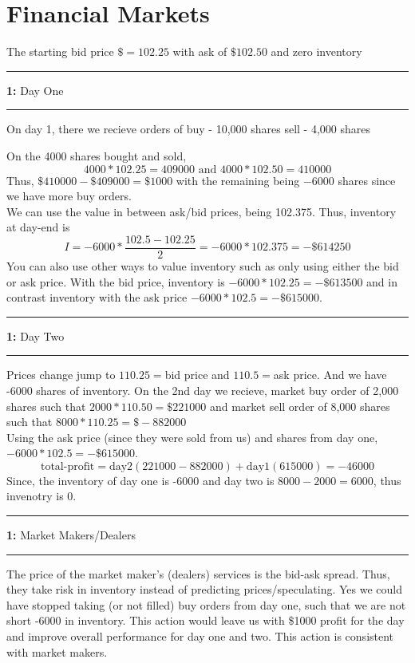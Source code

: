 \documentclass[11pt]{article}
\newcommand\question[2]{\vspace{.25in}\hrule\textbf{#1: } #2\vspace{.5em}\hrule\vspace{.10in}}
\begin{document}
\raggedright
\newcommand\NAME{Ramel Tranquille}  %
\newcommand\ANDREWID{rt1734}     %
\newcommand\HWNUM{1}              %


\section{Financial Markets}
The starting bid price $\$= 102.25$ with ask of $\$102.50$ and zero inventory
\question{1}{Day One} 
On day 1, there we recieve orders of
buy - 10,000 shares 
sell - 4,000 shares 

On the 4000 shares bought and sold,
\[
    4000 * 102.25 = 409000 \text{ and } 4000 * 102.50 = 410000
\]   
Thus, $\$410000 - \$409000 = \$1000$ with the remaining being $-6000$ shares since we have more buy orders. \\
We can use the value in between ask/bid prices, being 102.375. Thus, inventory at day-end is 
\[
    I = -6000 * \frac{102.5-102.25}{2} = -6000 * 102.375 = -\$614250
\]
You can also use other ways to value inventory such as only using either the bid or ask price. With the bid price, 
inventory is $-6000 * 102.25 = -\$613500$ and in contrast inventory with the ask price $-6000 * 102.5 = -\$615000$.

\question{1}{Day Two}
Prices change jump to $110.25=$bid price and $110.5=$ask price. And we have -6000 shares of inventory. On the 2nd day we recieve, 
market buy order of 2,000 shares such that $2000 * 110.50 = \$221000$ and market sell order of 8,000 shares such that $8000 * 110.25 = \$-882000$\\

Using the ask price (since they were sold from us) and shares from day one, $-6000 * 102.5 = -\$615000$.
\[
    \text{total-profit} = \text{day2}(221000 - 882000) + \text{day1}(615000) = - 46000
\]
Since, the inventory of day one is -6000 and day two is $8000-2000=6000$, thus invenotry is 0. 

\question{1}{Market Makers/Dealers}
The price of the market maker's (dealers) services is the bid-ask spread. Thus, they take risk in inventory instead of 
predicting prices/speculating. Yes we could have stopped taking (or not filled) buy orders from day one, such that 
we are not short -6000 in inventory. This action would leave us with \$1000 profit for the day and improve 
overall performance for day one and two. This action is consistent with market makers. 
\end{document}
